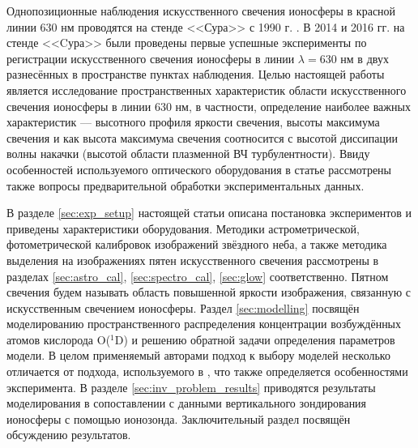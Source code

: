 \documentclass[12pt,a4paper]{article}
\begin{document}
Однопозиционные наблюдения искусственного свечения ионосферы в красной линии 630 нм проводятся на стенде <<Сура>> с 1990 г. \cite{BERNHARDTSCALESGRACHEtAl1991, BernhardtWongHubaEtAl2000, GrachKoschYashnovEtAl2007, Grach2012, Shindin2014, Klimenko2017}. 
В 2014 и 2016 гг. на стенде <<Cура>> были проведены первые успешные эксперименты по регистрации искусственного свечения ионосферы в линии $\lambda = 630$ нм в двух разнесённых в пространстве пунктах наблюдения.
Целью настоящей работы является исследование пространственных характеристик области искусственного свечения ионосферы в линии 630 нм, в частности, определение наиболее важных характеристик –-- высотного профиля яркости свечения, высоты максимума свечения и как высота максимума свечения соотносится с высотой диссипации волны накачки (высотой области плазменной ВЧ турбулентности).
Ввиду особенностей используемого оптического оборудования в статье рассмотрены также вопросы предварительной обработки экспериментальных данных.

В разделе \ref{sec:exp_setup} настоящей статьи описана постановка экспериментов и приведены характеристики оборудования. Методики астрометрической, фотометрической калибровок изображений звёздного неба, а также методика выделения на изображениях пятен искусственного свечения рассмотрены в разделах \ref{sec:astro_cal}, \ref{sec:spectro_cal}, \ref{sec:glow} соответственно. Пятном свечения будем называть область повышенной яркости изображения, связанную с искусственным свечением ионосферы.
Раздел \ref{sec:modelling} посвящён моделированию пространственного распределения концентрации возбуждённых атомов кислорода O($^1$D) и решению обратной задачи определения параметров модели. В целом применяемый авторами подход к выбору моделей несколько отличается от подхода, используемого в \cite{Gustavsson2001, Gustavsson2008}, что также определяется особенностями эксперимента. В разделе \ref{sec:inv_problem_results} приводятся результаты моделирования в сопоставлении с данными вертикального зондирования ионосферы с помощью ионозонда. Заключительный раздел посвящён обсуждению результатов.
\end{document}
